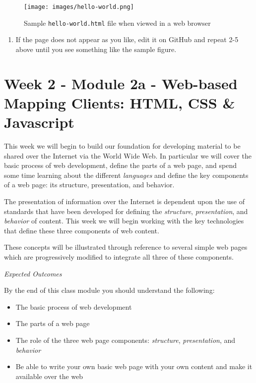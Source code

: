\documentclass[]{book}
\providecommand{\tightlist}{%
  \setlength{\itemsep}{0pt}\setlength{\parskip}{0pt}}
\begin{document}
\begin{figure}[htbp]
\centering
\texttt{[image: images/hello-world.png]}
\caption{Sample \texttt{hello-world.html} file when viewed in a web
browser}
\end{figure}

\begin{enumerate}
\def\labelenumi{\arabic{enumi}.}
\setcounter{enumi}{5}
\tightlist
\item
  If the page does not appear as you like, edit it on GitHub and repeat
  2-5 above until you see something like the sample figure.
\end{enumerate}

\chapter{Week 2 - Module 2a - Web-based Mapping Clients: HTML, CSS \&
Javascript}\label{week02}

This week we will begin to build our foundation for developing material
to be shared over the Internet via the World Wide Web. In particular we
will cover the basic process of web development, define the parts of a
web page, and spend some time learning about the different
\emph{languages} and define the key components of a web page: its
structure, presentation, and behavior.

The presentation of information over the Internet is dependent upon the
use of standards that have been developed for defining the
\emph{structure}, \emph{presentation}, and \emph{behavior} of content.
This week we will begin working with the key technologies that define
these three components of web content.

These concepts will be illustrated through reference to several simple
web pages which are progressively modified to integrate all three of
these components.

\emph{Expected Outcomes}

By the end of this class module you should understand the following:

\begin{itemize}
\item
  The basic process of web development
\item
  The parts of a web page
\item
  The role of the three web page components: \emph{structure},
  \emph{presentation}, and \emph{behavior}
\item
  Be able to write your own basic web page with your own content and
  make it available over the web
\end{itemize}
\end{document}
